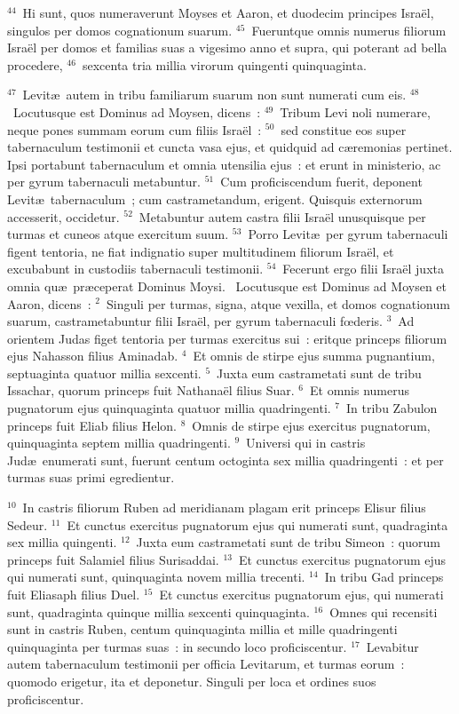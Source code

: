 ${}^{44}$~Hi sunt, quos numeraverunt Moyses et Aaron, et duodecim principes Isra\"el, singulos per domos cognationum suarum.
${}^{45}$~Fueruntque omnis numerus filiorum Isra\"el per domos et familias suas a vigesimo anno et supra, qui poterant ad bella procedere,
${}^{46}$~sexcenta tria millia virorum quingenti quinquaginta.


${}^{47}$~Levit\ae\ autem in tribu familiarum suarum non sunt numerati cum eis.
${}^{48}$~Locutusque est Dominus ad Moysen, dicens~:
${}^{49}$~Tribum Levi noli numerare, neque pones summam eorum cum filiis Isra\"el~:
${}^{50}$~sed constitue eos super tabernaculum testimonii et cuncta vasa ejus, et quidquid ad c\ae remonias pertinet. Ipsi portabunt tabernaculum et omnia utensilia ejus~: et erunt in ministerio, ac per gyrum tabernaculi metabuntur.
${}^{51}$~Cum proficiscendum fuerit, deponent Levit\ae\ tabernaculum~; cum castrametandum, erigent. Quisquis externorum accesserit, occidetur.
${}^{52}$~Metabuntur autem castra filii Isra\"el unusquisque per turmas et cuneos atque exercitum suum.
${}^{53}$~Porro Levit\ae\ per gyrum tabernaculi figent tentoria, ne fiat indignatio super multitudinem filiorum Isra\"el, et excubabunt in custodiis tabernaculi testimonii.
${}^{54}$~Fecerunt ergo filii Isra\"el juxta omnia qu\ae\ pr\ae ceperat Dominus Moysi.
~Locutusque est Dominus ad Moysen et Aaron, dicens~:
${}^{2}$~Singuli per turmas, signa, atque vexilla, et domos cognationum suarum, castrametabuntur filii Isra\"el, per gyrum tabernaculi fœderis.
${}^{3}$~Ad orientem Judas figet tentoria per turmas exercitus sui~: eritque princeps filiorum ejus Nahasson filius Aminadab.
${}^{4}$~Et omnis de stirpe ejus summa pugnantium, septuaginta quatuor millia sexcenti.
${}^{5}$~Juxta eum castrametati sunt de tribu Issachar, quorum princeps fuit Nathana\"el filius Suar.
${}^{6}$~Et omnis numerus pugnatorum ejus quinquaginta quatuor millia quadringenti.
${}^{7}$~In tribu Zabulon princeps fuit Eliab filius Helon.
${}^{8}$~Omnis de stirpe ejus exercitus pugnatorum, quinquaginta septem millia quadringenti.
${}^{9}$~Universi qui in castris Jud\ae\ enumerati sunt, fuerunt centum octoginta sex millia quadringenti~: et per turmas suas primi egredientur.


${}^{10}$~In castris filiorum Ruben ad meridianam plagam erit princeps Elisur filius Sedeur.
${}^{11}$~Et cunctus exercitus pugnatorum ejus qui numerati sunt, quadraginta sex millia quingenti.
${}^{12}$~Juxta eum castrametati sunt de tribu Simeon~: quorum princeps fuit Salamiel filius Surisaddai.
${}^{13}$~Et cunctus exercitus pugnatorum ejus qui numerati sunt, quinquaginta novem millia trecenti.
${}^{14}$~In tribu Gad princeps fuit Eliasaph filius Duel.
${}^{15}$~Et cunctus exercitus pugnatorum ejus, qui numerati sunt, quadraginta quinque millia sexcenti quinquaginta.
${}^{16}$~Omnes qui recensiti sunt in castris Ruben, centum quinquaginta millia et mille quadringenti quinquaginta per turmas suas~: in secundo loco proficiscentur.
${}^{17}$~Levabitur autem tabernaculum testimonii per officia Levitarum, et turmas eorum~: quomodo erigetur, ita et deponetur. Singuli per loca et ordines suos proficiscentur.



